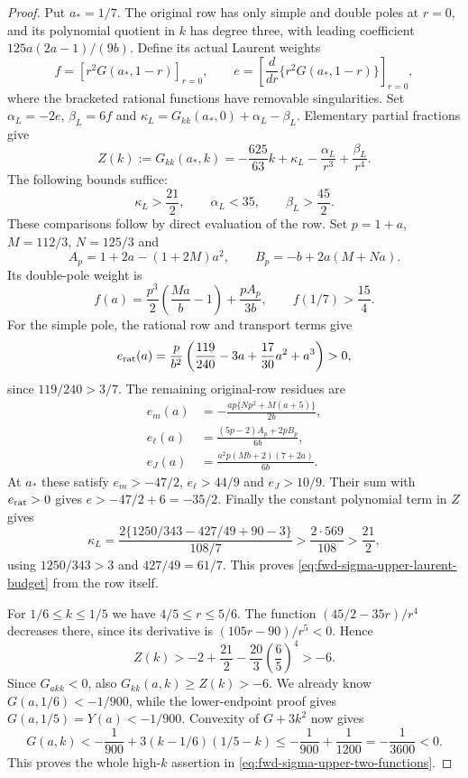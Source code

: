 \begin{proof}
Put $a_*=1/7$. The original row has only simple and double poles at
$r=0$, and its polynomial quotient in $k$ has degree three, with
leading coefficient $125a(2a-1)/(9b)$. Define its actual Laurent weights
\[
 f=\left[r^2G(a_*,1-r)\right]_{r=0},\qquad
 e=\left[\frac{d}{dr}\{r^2G(a_*,1-r)\}\right]_{r=0},
\]
where the bracketed rational functions have removable singularities.
Set $\alpha_L=-2e$, $\beta_L=6f$ and
$\kappa_L=G_{kk}(a_*,0)+\alpha_L-\beta_L$. Elementary partial fractions give
\[
 Z(k):=G_{kk}(a_*,k)=-\frac{625}{63}k+\kappa_L
                         -\frac{\alpha_L}{r^3}+\frac{\beta_L}{r^4}.
\]
The following bounds suffice:
\begin{equation}\label{eq:fwd-sigma-upper-laurent-budget}
 \kappa_L>\frac{21}2,\qquad \alpha_L<35,\qquad \beta_L>\frac{45}2.
\end{equation}
These comparisons follow by direct evaluation of the row.
Set $p=1+a$, $M=112/3$, $N=125/3$ and
\[
 A_p=1+2a-(1+2M)a^2,\qquad B_p=-b+2a(M+Na).
\]
Its double-pole weight is
\[
 f(a)=\frac{p^3}2\left(\frac{Ma}b-1\right)+\frac{pA_p}{3b},
 \qquad f(1/7)>\frac{15}4.
\]
For the simple pole, the rational row and transport terms give
\[
 e_{\rm rat}(a)=\frac p{b^2}
       \left(\frac{119}{240}-3a+\frac{17}{30}a^2+a^3\right)>0,
\]
since $119/240>3/7$. The remaining original-row residues are
\begin{align*}
 e_m(a)&=-\frac{ap\{Np^2+M(a+5)\}}{2b},\\
 e_\ell(a)&=\frac{(5p-2)A_p+2pB_p}{6b},\\
 e_J(a)&=\frac{a^2p(Mb+2)(7+2a)}{6b}.
\end{align*}
At $a_*$ these satisfy $e_m>-47/2$, $e_\ell>44/9$ and $e_J>10/9$.
Their sum with $e_{\rm rat}>0$ gives $e>-47/2+6=-35/2$.
Finally the constant polynomial term in $Z$ gives
\[
 \kappa_L=\frac{2\{1250/343-427/49+90-3\}}{108/7}
          >\frac{2\cdot569}{108}>\frac{21}2,
\]
using $1250/343>3$ and $427/49=61/7$. This proves
\eqref{eq:fwd-sigma-upper-laurent-budget} from the row itself.

For $1/6\leq k\leq1/5$ we have $4/5\leq r\leq5/6$.
The function $(45/2-35r)/r^4$ decreases there, since its derivative is
$(105r-90)/r^5<0$. Hence
\[
 Z(k)>-2+\frac{21}2-\frac{20}3\left(\frac65\right)^4>-6.
\]
Since $G_{akk}<0$, also $G_{kk}(a,k)\geq Z(k)>-6$.
We already know $G(a,1/6)<-1/900$, while the lower-endpoint proof gives
$G(a,1/5)=Y(a)<-1/900$. Convexity of $G+3k^2$ now gives
\[
 G(a,k)<-\frac1{900}+3(k-1/6)(1/5-k)
       \leq-\frac1{900}+\frac1{1200}=-\frac1{3600}<0.
\]
This proves the whole high-$k$ assertion in
\eqref{eq:fwd-sigma-upper-two-functions}.


\end{proof}
